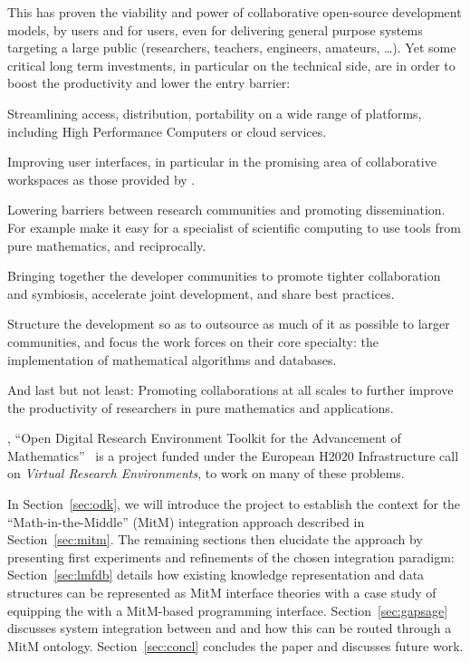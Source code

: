 This has proven the viability and power of collaborative open-source development models,
by users and for users, even for delivering general purpose systems targeting a large
public (researchers, teachers, engineers, amateurs, \ldots). Yet some critical long term
investments, in particular on the technical side, are in order to boost the productivity
and lower the entry barrier:
\begin{compactitem}
\item Streamlining access, distribution, portability on a wide range of platforms, including
  High Performance Computers or cloud services.
\item Improving user interfaces, in particular in the promising area of collaborative
  workspaces as those provided by \SMC.
\item Lowering barriers between research communities and promoting dissemination. For example
  make it easy for a specialist of scientific computing to use tools from pure
  mathematics, and reciprocally.
\item Bringing together the developer communities to promote tighter collaboration and
  symbiosis, accelerate joint development, and share best practices.
\item Structure the development so as to outsource as much of it as possible to larger communities, and focus
  the work forces on their core specialty: the implementation of mathematical algorithms
  and databases.
\item And last but not least: Promoting collaborations at all scales to further improve
  the productivity of researchers in pure mathematics and applications.
\end{compactitem}

\ODK, ``Open Digital Research Environment Toolkit for the Advancement
of Mathematics''~\cite{OpenDreamKit:on} is a project funded under the
European H2020 Infrastructure call \cite{EINFRA-9} on \emph{Virtual
  Research Environments}, to work on many of these problems.

In Section~\ref{sec:odk}, we will introduce the \ODK project  to establish the context for the
``Math-in-the-Middle'' (MitM) integration approach described in
Section~\ref{sec:mitm}. The remaining sections then elucidate the approach by presenting
first experiments and refinements of the chosen integration paradigm:
Section~\ref{sec:lmfdb} details how existing knowledge representation and data structures
can be represented as MitM interface theories with a case study of equipping the \LMFDB
with a MitM-based programming interface.  Section~\ref{sec:gapsage} discusses system
integration between \GAP and \Sage and how this can be routed through a MitM
ontology. Section~\ref{sec:concl} concludes the paper and discusses future work.


